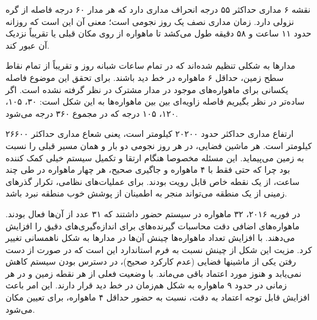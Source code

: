 نقشه ۶ مداری حداکثر ۵۵ درجه انحراف مداری دارد که هر مدار ۶۰ درجه فاصله از گره نزولی دارد. زمان مداری نصف یک روز نجومی است؛ معنی آن این است که روزانه حدود ۱۱ ساعت و ۵۸ دقیقه طول می‌کشد تا ماهواره از روی مکان قبلی یا تقریباً نزدیک آن عبور کند.


مدارها به شکلی تنظیم شده‌اند که در تمام ساعات شبانه روز و تقریباً از تمام نقاط سطح زمین، حداقل ۶ ماهواره در خط دید باشند. برای تحقق این موضوع فاصله یکسانی برای ماهواره‌های موجود در مدار مشترک در نظر گرفته نشده‌ است. اگر ساده‌تر در نظر بگیریم فاصله زاویه‌ای بین بین ماهواره‌ها به این شکل است: ۳۰،  ۱۰۵،  ۱۲۰،  ۱۰۵ درجه که در مجموع ۳۶۰ درجه می‌شود.


ارتفاع مداری حداکثر حدود ۲۰۲۰۰ کیلومتر است، یعنی شعاع مداری حداکثر ۲۶۶۰۰ کیلومتر است. هر ماشین فضایی، در هر روز نجومی دو بار و همان مسیر قبلی را نسبت به زمین می‌پیماید. این مسئله مخصوصا هنگام ارتقا و تکمیل سیستم خیلی کمک‌ کننده بود چرا که حتی فقط با ۴ ماهواره و جاگیری صحیح، هر چهار ماهواره در طی چند ساعت، از یک نقطه خاص قابل رویت بودند. برای عملیات‌های نظامی، تکرار گذرهای زمینی از یک منطقه می‌تواند منجر به اطمینان از پوشش خوب منطقه نبرد باشد.


در فوریه ۲۰۱۶، ۳۲ ماهواره در سیستم  حضور داشتند که ۳۱ عدد از آن‌ها فعال بودند. ماهواره‌های اضافی دقت محاسبات گیرنده‌های  برای اندازه‌گیری‌های دقیق را افزایش می‌دهند. با افزایش تعداد ماهواره‌ها چینش آن‌ها در مدارها به شکل ناهمسانی تغییر کرد. مزیت این شکل از چینش نسبت به فرم استاندارد این است که در صورت از دست رفتن یکی از ماشینها فضایی (عدم کارکرد صحیح)، در دسترس بودن سیستم کاهش نمی‌یابد و هنوز مورد اعتماد باقی می‌ماند. با وضعیت فعلی از هر نقطه زمین و در هر زمانی در حدود ۹ ماهواره به شکل هم‌زمان در خط دید قرار دارند. این امر باعث افزایش قابل توجه اعتماد به دقت، نسبت به حضور حداقل ۴ ماهواره، برای تعیین مکان می‌شود.
